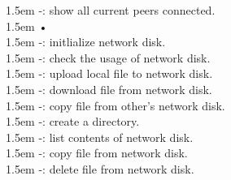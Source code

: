 \documentclass[10pt,a4paper]{article}
\begin{document}
\hangindent 1.5em
\noindent   
-: show all current peers connected.
  \vspace{-0.5em}
\\

\hangindent 1.5em
\noindent   
•
  \vspace{-0.8em}
\\

\hangindent 1.5em
\noindent   
-: initlialize network disk.
  \vspace{-0.8em}
\\

\hangindent 1.5em
\noindent   
-: check the usage of network disk.
  \vspace{-0.8em}
\\

\hangindent 1.5em
\noindent   
-: upload local file to network disk.
  \vspace{-0.8em}
\\

\hangindent 1.5em
\noindent   
-: download file from network disk.
  \vspace{-0.8em}
\\

\hangindent 1.5em
\noindent   
-: copy file from other's network disk.
  \vspace{-0.8em}
\\

\hangindent 1.5em
\noindent   
-: create a directory.
  \vspace{-0.8em}
\\

\hangindent 1.5em
\noindent   
-: list contents of network disk.
  \vspace{-0.8em}
\\

\hangindent 1.5em
\noindent   
-: copy file from network disk.
  \vspace{-0.8em}
\\

\hangindent 1.5em
\noindent   
-: delete file from network disk.
  \vspace{-0.8em}
\\
\end{document}

